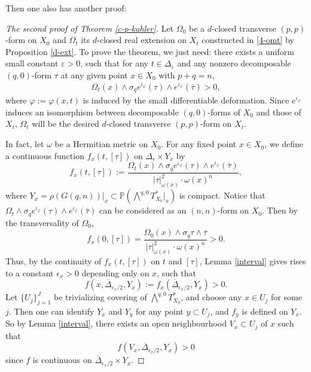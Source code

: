 \documentclass[12pt]{amsart}
\numberwithin{equation}{section}
\renewcommand{\1}{\mathds{1}}
\renewcommand{\>}{\rightarrow}
\def\b{\bar}
\def\mb{\mathbb}
\begin{document}
Then one also has another proof:
\begin{proof}[{The second proof of Theorem \ref{c-p-kahler}}]
Let $\Omega_0$ be a $d$-closed transverse $(p,p)$-form on $X_0$ and $\Omega_t$ its $d$-closed real extension on $X_t$ constructed in \eqref{4-omt}
by Proposition \ref{d-ext}. To prove the theorem,  we just need: there exists a uniform small constant $\varepsilon>0$,
such that for any $t\in \Delta_\varepsilon$ and any nonzero
decomposable $(q,0)$-form $\tau$ at any given point $x\in X_0$  with $p+q=n$,
\begin{align}\label{11}
  \Omega_t(x)\wedge \sigma_q e^{\iota_{\varphi}}(\tau)\wedge e^{\iota_{\b{\varphi}}}(\b{\tau})>0,
\end{align}
where $\varphi:=\varphi(x,t)$ is induced by the
small differentiable deformation. Since
$e^{\iota_{\varphi}}$ induces an isomorphism between decomposable $(q,0)$-forms of $X_0$
and those of $X_t$, $\Omega_t$ will be the desired $d$-closed transverse $(p,p)$-form on $X_t$.


In fact, let $\omega$ be a Hermitian metric on $X_0$.
For any fixed point $x\in X_0$, we define a continuous function $f_{x}(t,[\tau])$
on $\Delta_\epsilon\times Y_{x}$ by
\begin{equation}\label{fxttau}
f_{x}(t,[\tau]):=\frac{ \Omega_t(x)\wedge \sigma_q e^{\iota_{\varphi}}(\tau)\wedge e^{\iota_{\b{\varphi}}}(\b{\tau})}{|\tau|^2_{\omega(x)}\cdot \omega(x)^n},
 \end{equation}
where $Y_x=\rho(G(q,n))|_{x}\subset \mb{P}(\bigwedge^{q,0}T^*_{X_0}|_x)$ is compact. Notice that
$\Omega_t\wedge \sigma_q e^{\iota_{\varphi}}(\tau)\wedge e^{\iota_{\b{\varphi}}}(\b{\tau})$ can be considered as an $(n,n)$-form on $X_0$.
Then by the transversality of $\Omega_0$,
$$f_x(0,[\tau])=\frac{ \Omega_0(x)\wedge \sigma_q \tau\wedge \b{\tau}}{|\tau|^2_{\omega(x)}\cdot \omega(x)^n}>0.$$
Thus, by the continuity of $f_{x}(t,[\tau])$ on $t$ and $[\tau]$,  Lemma \ref{interval} gives rises to a constant $\epsilon_x>0$ depending only on $x$, such that
$$\label{12}
  f(x,\overline{\Delta}_{\epsilon_x/2},Y_x):=f_{x}(\overline{\Delta}_{\epsilon_x/2},Y_x)>0.
$$
Let $\{U_j\}_{j=1}^J$ be trivializing covering of $\bigwedge^{q,0}T^*_{X_0}$, and choose any $x\in U_j$ for some $j$. Then one can identify $Y_x$ and $Y_y$ for any point $y\subset U_j$, and $f_y$ is defined on $Y_x$.
So by Lemma \ref{interval}, there exists an open neighbourhood $V_x\subset U_j$ of $x$ such that
$$
  f(V_x, \overline{\Delta}_{\epsilon_x/2},Y_x)>0
$$
since $f$ is continuous on $\overline{\Delta}_{\epsilon_x/2}\times Y_x$.


\end{proof}
\end{document}
